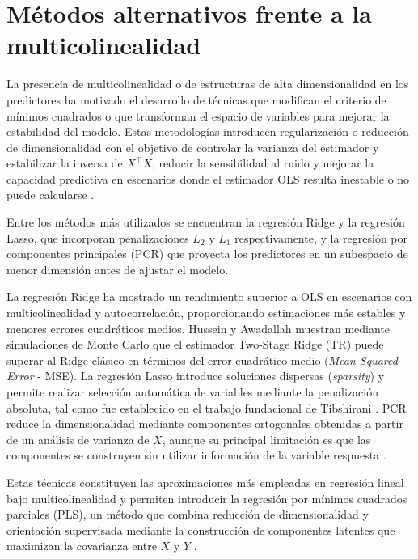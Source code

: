 \documentclass[12pt,a4paper]{report}
\begin{document}
\section{Métodos alternativos frente a la multicolinealidad}

La presencia de multicolinealidad o de estructuras de alta dimensionalidad en los predictores ha motivado el desarrollo de técnicas que modifican el criterio de mínimos cuadrados o que transforman el espacio de variables para mejorar la estabilidad del modelo. Estas metodologías introducen regularización o reducción de dimensionalidad con el objetivo de controlar la varianza del estimador y estabilizar la inversa de \(X^\top X\), reducir la sensibilidad al ruido y mejorar la capacidad predictiva en escenarios donde el estimador OLS resulta inestable o no puede calcularse \cite{hastie2009}.

Entre los métodos más utilizados se encuentran la regresión Ridge y la regresión Lasso, que incorporan penalizaciones \(L_2\) y \(L_1\) respectivamente, y la regresión por componentes principales (PCR) que proyecta los predictores en un subespacio de menor dimensión antes de ajustar el modelo. 

La regresión Ridge ha mostrado un rendimiento superior a OLS en escenarios con multicolinealidad y autocorrelación, proporcionando estimaciones más estables y menores errores cuadráticos medios. Hussein y Awadallah \cite{hussein2021} muestran mediante simulaciones de Monte Carlo que el estimador Two-Stage Ridge (TR) puede superar al Ridge clásico en términos del error cuadrático medio (\textit{Mean Squared Error} - MSE). La regresión Lasso introduce soluciones dispersas (\textit{sparsity}) y permite realizar selección automática de variables mediante la penalización absoluta, tal como fue establecido en el trabajo fundacional de Tibshirani \cite{tibshirani1996}. PCR reduce la dimensionalidad mediante componentes ortogonales obtenidas a partir de un análisis de varianza de \(X\), aunque su principal limitación es que las componentes se construyen sin utilizar información de la variable respuesta \cite{pascual2020}.

Estas técnicas constituyen las aproximaciones más empleadas en regresión lineal bajo multicolinealidad y permiten introducir la regresión por mínimos cuadrados parciales (PLS), un método que combina reducción de dimensionalidad y orientación supervisada mediante la construcción de componentes latentes que maximizan la covarianza entre \(X\) y \(Y\) \cite{geladi1986,abdi2010}.
\end{document}
